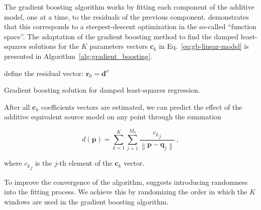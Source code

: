 The gradient boosting algorithm works by fitting each component of the
additive model, one at a time, to the residuals of the previous component.
\citet{friedman2001} demonstrates that this corresponds to a steepest-descent
optimization in the so-called ``function space''.
The adaptation of the gradient boosting method to find the damped least-squares
solutions for the $K$ parameters vectors $\mathbf{c}_k$ in
Eq.~\ref{eq:gb-linear-model} is presented in
Algorithm~\ref{alg:gradient_boosting}.

\begin{algorithm}[!h]
  \DontPrintSemicolon
  define the residual vector: $\mathbf{r}_{0} = \mathbf{d}^o$ \;
  \BlankLine
  \caption{Gradient boosting solution for damped least-squares regression.}
  \label{alg:gradient_boosting}
\end{algorithm}

After all $\mathbf{c}_k$ coefficients vectors are estimated, we can predict the
effect of the additive equivalent source model on any point through the
summation

\begin{equation}
    d(\mathbf{p}) =
    \sum\limits_{k=1}^K \sum\limits_{j=1}^{M_k}
    \frac{{c_k}_j}{\left\lVert \mathbf{p} - \mathbf{q}_j \right\rVert}
    \ ,
\end{equation}

\noindent where ${c_k}_j$ is the $j$-th element of the $\mathbf{c}_k$ vector.

To improve the convergence of the algorithm, \citet{friedman2002} suggests
introducing randomness into the fitting process. We achieve this by randomizing
the order in which the $K$ windows are used in the gradient boosting algorithm.

